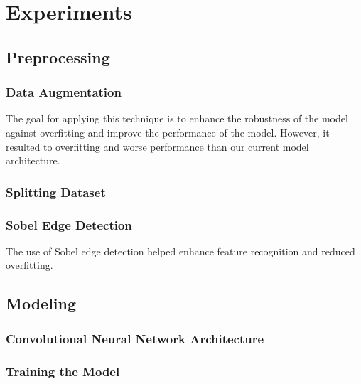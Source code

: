 \section{Experiments}

\subsection{Preprocessing}

\subsubsection{Data Augmentation}

The goal for applying this technique is to enhance the robustness of the model against overfitting and improve the performance of the model. However, it resulted to overfitting and worse performance than our current model architecture.


\subsubsection{Splitting Dataset}


\subsubsection{Sobel Edge Detection}

The use of Sobel edge detection helped enhance feature recognition and reduced overfitting. 

\subsection{Modeling}

\subsubsection{Convolutional Neural Network Architecture}


\subsubsection{Training the Model}

